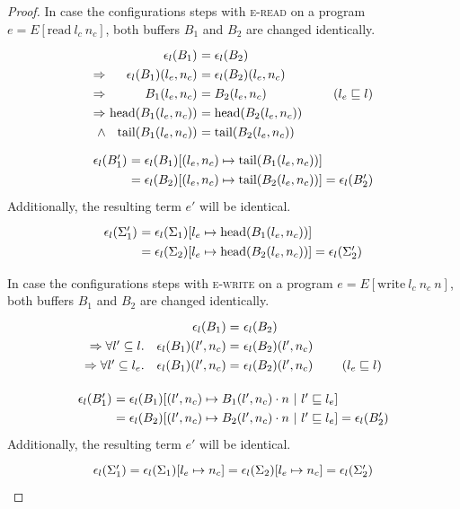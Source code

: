 \documentclass[10pt,preprint]{sigplanconf}
\newcommand{\arrayStretch}{1.28}
\begin{document}
\begin{proof}
In case the configurations steps with \textsc{e-read} on a program $e=E[\text{read}~l_c~n_c]$, both buffers $B_1$ and $B_2$ are changed identically.
\[\arraycolsep=1.6pt\def\arraystretch{\arrayStretch}
\begin{array}{rrl}
  & \epsilon_l(B_1) &= \epsilon_l(B_2) \\
  \Rightarrow & \epsilon_l(B_1)(l_e,n_c) &= \epsilon_l(B_2)(l_e,n_c) \\
  \Rightarrow &  B_1(l_e,n_c) &= B_2(l_e,n_c)~~~~~~~~~~~~~~~~(l_e \sqsubseteq l) \\
  \Rightarrow & \text{head}(B_1(l_e,n_c)) &= \text{head} (B_2(l_e,n_c)) \\
  \wedge & \text{tail}(B_1(l_e,n_c)) &= \text{tail} (B_2(l_e,n_c))
\end{array} \]
\[\arraycolsep=1.6pt\def\arraystretch{\arrayStretch}
\begin{array}{rl}
  \epsilon_l(B'_1) & = \epsilon_l(B_1)[(l_e,n_c) \mapsto \text{tail} (B_1(l_e,n_c))] \\
                   & = \epsilon_l(B_2)[(l_e,n_c) \mapsto \text{tail} (B_2(l_e,n_c))] = \epsilon_l(B'_2) \\
\end{array} \]
  Additionally, the resulting term $e'$ will be identical.
\[\arraycolsep=1.6pt\def\arraystretch{\arrayStretch}
\begin{array}{rl}
  \epsilon_l(\Sigma'_1) & = \epsilon_l(\Sigma_1)[l_e \mapsto \text{head}(B_1(l_e,n_c))]  \\
                        & = \epsilon_l(\Sigma_2)[l_e \mapsto \text{head}(B_2(l_e,n_c))] = \epsilon_l(\Sigma'_2)
\end{array} \]

In case the configurations steps with \textsc{e-write} on a program $e=E[\text{write}~l_c~n_c~n]$, both buffers $B_1$ and $B_2$ are changed identically.
\[\arraycolsep=1.6pt\def\arraystretch{\arrayStretch}
\begin{array}{rrlr}
  &~~\epsilon_l(B_1) =& \epsilon_l(B_2) \\
  \Rightarrow \forall l' \subseteq l.&~~\epsilon_l(B_1)(l',n_c) =& \epsilon_l(B_2)(l',n_c) \\
  \Rightarrow \forall l' \subseteq l_e.&~~\epsilon_l(B_1)(l',n_c) =& \epsilon_l(B_2)(l',n_c) & ~~~~~~(l_e \sqsubseteq l)
\end{array} \]


\[\arraycolsep=1.6pt\def\arraystretch{\arrayStretch}
\begin{array}{rl}
  \epsilon_l(B'_1) & = \epsilon_l(B_1)[(l',n_c) \mapsto B_1(l',n_c) \cdot n~|~ l' \sqsubseteq l_e ] \\
                   & = \epsilon_l(B_2)[(l',n_c) \mapsto B_2(l',n_c) \cdot n~|~ l' \sqsubseteq l_e ] = \epsilon_l(B'_2) \\
\end{array} \]
  Additionally, the resulting term $e'$ will be identical.
\[\arraycolsep=1.6pt\def\arraystretch{\arrayStretch}
\begin{array}{c}
  \epsilon_l(\Sigma'_1) = \epsilon_l(\Sigma_1)[l_e \mapsto n_c] = \epsilon_l(\Sigma_2)[l_e \mapsto n_c] = \epsilon_l(\Sigma'_2)
\end{array} \]


\end{proof}
\end{document}
